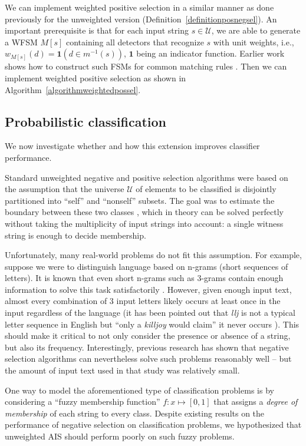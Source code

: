 \documentclass{llncs}
\begin{document}
We can implement weighted positive selection in a similar manner as done previously for the unweighted version
(Definition~\ref{definitionposnegsel}). An important prerequisite is that 
for each input string $s \in \mathcal{U}$, we are able to generate a WFSM
$M[s]$ containing all detectors that recognize $s$ with unit weights, i.e.,
$w_{M[s]}(d) = \mathbf{1}(d \in m^{-1}(s))$, $\mathbf{1}$ being an indicator function.
Earlier work shows how to construct such FSMs for common matching 
rules \cite{Textor2014}. 
Then we can implement weighted positive selection as shown in Algorithm~\ref{algorithmweightedpossel}.


\subsection{Probabilistic classification}

\label{sectionempirical}

We now investigate whether and how this extension improves classifier performance.

Standard unweighted negative and positive selection algorithms
were based on the assumption that the universe
$\mathcal{U}$ of elements to be classified is 
disjointly partitioned into ``self'' and ``nonself'' subsets.
The goal was to estimate the boundary between these two classes \cite{Forrest1994,Timmis2008},
which in theory can be solved perfectly without taking the multiplicity of input
strings into account: a single witness string is enough to decide
membership.

Unfortunately, many real-world problems do not fit this assumption.
For example, suppose we were to distinguish language based on n-grams (short sequences of letters).
It is known that even short n-grams such as 3-grams contain enough information
to solve this task satisfactorily \cite{Dunning1996}. However, given enough input text, almost 
every combination of 3 input letters likely occurs at least once in the input
regardless of the language (it has been pointed out that \emph{llj}
is not a typical letter sequence in English but ``only a \emph{killjoy}
would claim'' it never occurs \cite{Dunning1996}). This should make it critical to not only consider
the presence or absence of a string, but also its frequency. Interestingly, 
previous research has shown that negative selection algorithms can nevertheless 
solve such problems reasonably well \cite{Wortel2020t} -- 
but the amount of input text used in that
study was relatively small. 

One way to model the aforementioned type of classification problems is by considering
a ``fuzzy membership function'' $f: x \mapsto [0,1]$ that assigns a \emph{degree of membership}
of each string to every class. Despite existing results on the performance of 
negative selection on classification problems, we hypothesized that unweighted AIS 
should perform poorly on such fuzzy problems.
\end{document}
